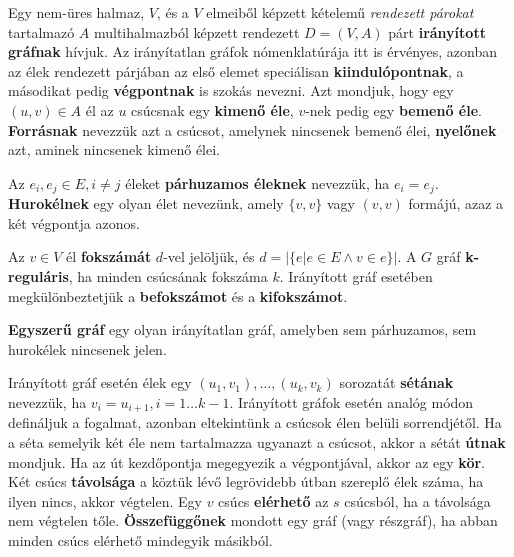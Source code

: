 \begin{definition}
Egy nem-üres halmaz, $V$, és a $V$ elmeiből képzett kételemű \textit{rendezett párokat} tartalmazó $A$ multihalmazból képzett rendezett $D=(V,A)$ párt \textbf{irányított gráfnak} hívjuk. Az irányítatlan gráfok nómenklatúrája itt is érvényes, azonban az élek rendezett párjában az első elemet speciálisan \textbf{kiindulópontnak}, a másodikat pedig \textbf{végpontnak} is szokás nevezni. Azt mondjuk, hogy egy $(u, v) \in A$ él az $u$ csúcsnak egy \textbf{kimenő éle}, $v$-nek pedig egy \textbf{bemenő éle}. \textbf{Forrásnak} nevezzük azt a csúcsot, amelynek nincsenek bemenő élei, \textbf{nyelőnek} azt, aminek nincsenek kimenő élei.
\end{definition}

\begin{definition}
Az $e_i, e_j \in E, i \neq j$ éleket \textbf{párhuzamos éleknek} nevezzük, ha $e_i=e_j$. \textbf{Hurokélnek} egy olyan élet nevezünk, amely $\{v, v\}$ vagy $(v, v)$ formájú, azaz a két végpontja azonos.
\end{definition}

\begin{definition}
Az $v \in V$ él \textbf{fokszámát} $d$-vel jelöljük, és $d=| \{ e | e \in E \land v \in e \}|$. A $G$ gráf \textbf{k-reguláris}, ha minden csúcsának fokszáma $k$. Irányított gráf esetében megkülönbeztetjük a \textbf{befokszámot} és a \textbf{kifokszámot}.
\end{definition}

\begin{definition}
\textbf{Egyszerű gráf} egy olyan irányítatlan gráf, amelyben sem párhuzamos, sem hurokélek nincsenek jelen.
\end{definition}


\begin{definition}
Irányított gráf esetén élek egy $(u_1, v_1), \ldots, (u_k, v_k)$ sorozatát \textbf{sétának} nevezzük, ha $v_i=u_{i+1}, i=1 \ldots k-1$. Irányított gráfok esetén analóg módon defináljuk a fogalmat, azonban eltekintünk a csúcsok élen belüli sorrendjétől. Ha a séta semelyik két éle nem tartalmazza ugyanazt a csúcsot, akkor a sétát \textbf{útnak} mondjuk. Ha az út kezdőpontja megegyezik a végpontjával, akkor az egy \textbf{kör}. Két csúcs \textbf{távolsága} a köztük lévő legrövidebb útban szereplő élek száma, ha ilyen nincs, akkor végtelen. Egy $v$ csúcs \textbf{elérhető} az $s$ csúcsból, ha a távolsága nem végtelen tőle. \textbf{Összefüggőnek} mondott egy gráf (vagy részgráf), ha abban minden csúcs elérhető mindegyik másikból.
\end{definition}


